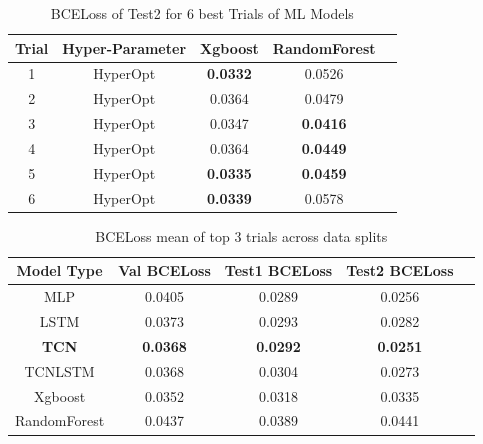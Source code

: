 \begin{table}[t]
\caption{BCELoss of Test2 for 6 best Trials of ML Models}
\vspace{0.1 in}
\centering
\resizebox{3.3in}{!}
{%
\begin{tabular}{|c|c|c|c|c|}
\hline
{\bf Trial} & {\bf Hyper-Parameter} & {\bf Xgboost} & {\bf RandomForest} \\  
\hline\hline
1  		&  HyperOpt &  {\bf 0.0332} &  0.0526   \\ 
2	  		&  HyperOpt &  0.0364 &  0.0479   \\ 
3  		&  HyperOpt &  0.0347 &  {\bf 0.0416}  \\ 
4	  		&  HyperOpt &  0.0364 &  {\bf 0.0449}  \\ 
5	  		&  HyperOpt &  {\bf 0.0335} &  {\bf 0.0459}  \\ 
6	  		&  HyperOpt &  {\bf 0.0339} &  0.0578  \\ 
\hline
\end{tabular}
}
\label{tab:mlmodels}
\end{table}


\begin{table}[t]
\caption{ BCELoss mean of top 3 trials across data splits}
\vspace{0.1 in}
\centering
\resizebox{3.3in}{!}
{%
\begin{tabular}{|c|c|c|c|c|}
\hline
{\bf Model Type} & {\bf Val BCELoss} & {\bf Test1 BCELoss} & {\bf Test2 BCELoss} \\ 
\hline\hline 
MLP	  		&  0.0405 &  0.0289 &  0.0256  \\ \hline
LSTM  		&  0.0373 &  0.0293 &  0.0282 \\ \hline
{\bf TCN}			&  {\bf 0.0368}  &  {\bf 0.0292} &  {\bf 0.0251}  \\ \hline
TCNLSTM 	& 0.0368  & 0.0304	& 0.0273	 \\ \hline
Xgboost 	& 0.0352 & 0.0318	& 0.0335	\\ \hline
RandomForest & 0.0437 & 0.0389	& 0.0441	\\ \hline
\end{tabular}
}
\label{tab:training}
\end{table}


